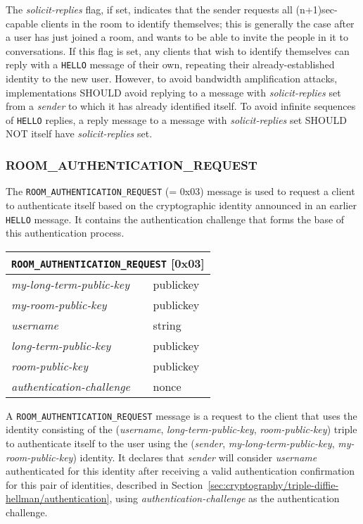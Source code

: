 \documentclass{article}
\def\message#1{\texttt{#1}}
\def\field#1{\textit{#1}}
\def\type#1{\textsf{#1}}
\newenvironment{basicmessage}[2]{
\newcommand{\messagefield}[2]{
\field{##1} & \type{##2} \\
\hline
}
\hspace{2em minus 2em}\begin{tabular}{|l|l|}
\hline
\multicolumn{2}{|c|}{\message{#1} [#2]} \\
\hline
\hline
}{
\end{tabular}
}
\begin{document}
The \field{solicit-replies} flag, if set, indicates that the sender requests all (n+1)sec-capable clients in the room to identify themselves; this is generally the case after a user has just joined a room, and wants to be able to invite the people in it to conversations.
If this flag is set, any clients that wish to identify themselves can reply with a \message{HELLO} message of their own, repeating their already-established identity to the new user.
However, to avoid bandwidth amplification attacks, implementations SHOULD avoid replying to a message with \field{solicit-replies} set from a \field{sender} to which it has already identified itself.
To avoid infinite sequences of \message{HELLO} replies, a reply message to a message with \field{solicit-replies} set SHOULD NOT itself have \field{solicit-replies} set.


\subsubsection{ROOM\_AUTHENTICATION\_REQUEST}
\label{sec:messages/room-authentication-request}

The \message{ROOM\_AUTHENTICATION\_REQUEST} (= 0x03) message is used to request a client to authenticate itself based on the cryptographic identity announced in an earlier \message{HELLO} message.
It contains the authentication challenge that forms the base of this authentication process.

\begin{basicmessage}{ROOM\_AUTHENTICATION\_REQUEST}{0x03}
\messagefield{my-long-term-public-key}{publickey}
\messagefield{my-room-public-key}{publickey}
\messagefield{username}{string}
\messagefield{long-term-public-key}{publickey}
\messagefield{room-public-key}{publickey}
\messagefield{authentication-challenge}{nonce}
\end{basicmessage}

A \message{ROOM\_AUTHENTICATION\_REQUEST} message is a request to the client that uses the identity consisting of the (\field{username}, \field{long-term-public-key}, \field{room-public-key}) triple to authenticate itself to the user using the (\field{sender}, \field{my-long-term-public-key}, \field{my-room-public-key}) identity.
It declares that \field{sender} will consider \field{username} authenticated for this identity after receiving a valid authentication confirmation for this pair of identities, described in Section~\ref{sec:cryptography/triple-diffie-hellman/authentication}, using \field{authentication-challenge} as the authentication challenge.
\end{document}
